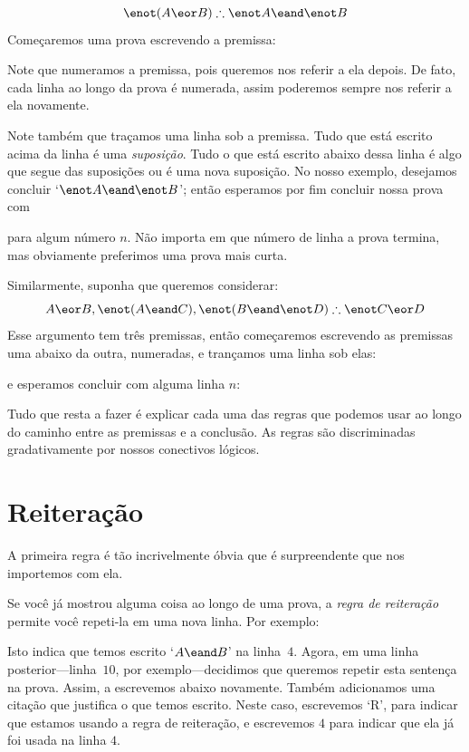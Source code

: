 	$$\enot (A \eor B) \therefore \enot A \eand \enot B$$
Começaremos uma prova escrevendo a premissa: 
\begin{fitchproof}
\end{fitchproof}
 
Note que numeramos a premissa, pois queremos nos referir  a ela depois. De fato, cada  linha  ao longo da prova  é numerada, assim poderemos sempre nos referir a ela novamente. 

 Note também que traçamos  uma linha sob a  premissa. Tudo que está escrito acima da linha é uma 
\emph{suposição}. Tudo o que está escrito abaixo dessa linha é algo que segue das suposições ou é uma nova suposição. No nosso exemplo, desejamos concluir 
 `$\enot A \eand \enot B$';  então esperamos por fim concluir nossa prova com
\begin{fitchproof}
\end{fitchproof}
para algum número $n$. Não importa em que número de linha a prova termina, mas obviamente preferimos uma prova mais curta. 

Similarmente,  suponha que queremos considerar:
$$A\eor B, \enot (A\eand C), \enot (B \eand \enot D) \therefore \enot C\eor D$$
Esse argumento tem três premissas, então  começaremos escrevendo as premissas uma abaixo da outra, numeradas, e trançamos uma linha sob elas: 
\begin{fitchproof}
\end{fitchproof}
e esperamos concluir com alguma linha $n$:
\begin{fitchproof}
\end{fitchproof}
  Tudo que resta a fazer é explicar cada uma das regras que podemos usar ao longo do caminho entre as premissas e a conclusão.  As regras são  discriminadas gradativamente por nossos conectivos lógicos.

\section{Reiteração}
 A primeira regra é tão incrivelmente óbvia que é surpreendente que nos importemos com ela.

Se você já mostrou alguma coisa ao longo de uma prova, a  \emph{regra de  reiteração} permite você repeti-la em uma nova linha.  Por exemplo:
\begin{fitchproof}
	\have[$\vdots$]{}{\vdots}
	 
\end{fitchproof}
Isto indica que temos escrito `$A \eand B$' na linha~$4$. Agora, em uma linha posterior---linha~$10$, por exemplo---decidimos que queremos repetir esta sentença na prova. Assim, a escrevemos abaixo novamente.  Também adicionamos uma citação que justifica o que temos escrito. Neste caso, escrevemos  `R',  para indicar que estamos usando a regra de reiteração,  e escrevemos  $4$ para indicar  que ela já foi usada na linha $4$.

